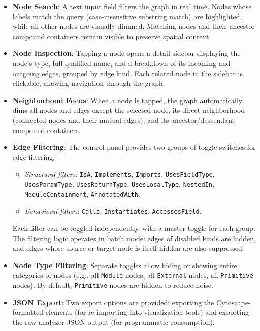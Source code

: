 \begin{itemize}
  \item \textbf{Node Search}: A text input field filters the graph in real time. Nodes whose labels match the query (case-insensitive substring match) are highlighted, while all other nodes are visually dimmed. Matching nodes and their ancestor compound containers remain visible to preserve spatial context.
  \item \textbf{Node Inspection}: Tapping a node opens a detail sidebar displaying the node's type, full qualified name, and a breakdown of its incoming and outgoing edges, grouped by edge kind. Each related node in the sidebar is clickable, allowing navigation through the graph.
  \item \textbf{Neighborhood Focus}: When a node is tapped, the graph automatically dims all nodes and edges except the selected node, its direct neighborhood (connected nodes and their mutual edges), and its ancestor/descendant compound containers.
  \item \textbf{Edge Filtering}: The control panel provides two groups of toggle switches for edge filtering:
    \begin{itemize}
      \item \textit{Structural filters}: \texttt{IsA}, \texttt{Implements}, \texttt{Imports}, \texttt{UsesFieldType}, \texttt{UsesParamType}, \texttt{UsesReturnType}, \texttt{UsesLocalType}, \texttt{NestedIn}, \texttt{ModuleContainment}, \texttt{AnnotatedWith}.
      \item \textit{Behavioral filters}: \texttt{Calls}, \texttt{Instantiates}, \texttt{AccessesField}.
    \end{itemize}
    Each filter can be toggled independently, with a master toggle for each group. The filtering logic operates in batch mode: edges of disabled kinds are hidden, and edges whose source or target node is itself hidden are also suppressed.
  \item \textbf{Node Type Filtering}: Separate toggles allow hiding or showing entire categories of nodes (e.g., all \texttt{Module} nodes, all \texttt{External} nodes, all \texttt{Primitive} nodes). By default, \texttt{Primitive} nodes are hidden to reduce noise.
  \item \textbf{JSON Export}: Two export options are provided: exporting the Cytoscape-formatted elements (for re-importing into visualization tools) and exporting the raw analyzer JSON output (for programmatic consumption).
\end{itemize}

